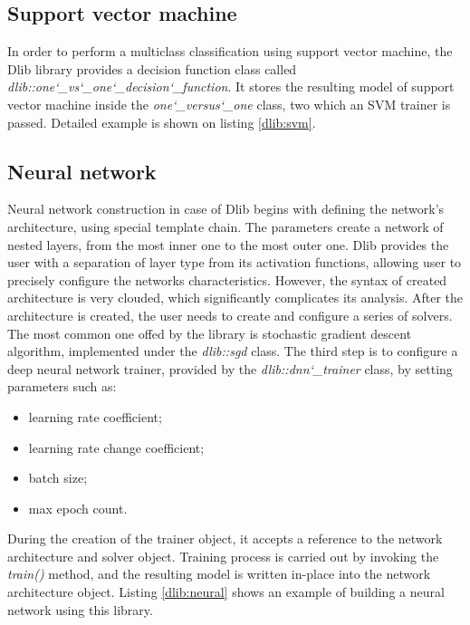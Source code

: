 
\subsection{Support vector machine}

In order to perform a multiclass classification using support vector machine, the Dlib library provides a decision function class called \textit{dlib::one\char`_vs\char`_one\char`_decision\char`_function}. It stores the resulting model of support vector machine inside the \textit{one\char`_versus\char`_one} class, two which an SVM trainer is passed. Detailed example is shown on listing \ref{dlib:svm}.


\subsection{Neural network}

Neural network construction in case of Dlib begins with defining the network's architecture, using special template chain. The parameters create a network of nested layers, from the most inner one to the most outer one. Dlib provides the user with a separation of layer type from its activation functions, allowing user to precisely configure the networks characteristics. However, the syntax of created architecture is very clouded, which significantly complicates its analysis. After the architecture is created, the user needs to create and configure a series of solvers. The most common one offed by the library is stochastic gradient descent algorithm, implemented under the \textit{dlib::sgd} class. The third step is to configure a deep neural network trainer, provided by the \textit{dlib::dnn\char`_trainer} class, by setting parameters such as:

\begin{itemize}
	\item learning rate coefficient;
	\item learning rate change coefficient; 
	\item batch size;
	\item max epoch count.
\end{itemize}

During the creation of the trainer object, it accepts a reference to the network architecture and solver object. Training process is carried out by invoking the \textit{train()} method, and the resulting model is written in-place into the network architecture object. Listing \ref{dlib:neural} shows an example of building a neural network using this library.

